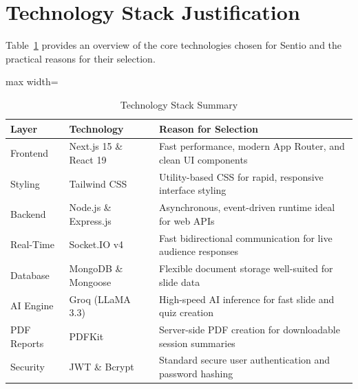 \section{Technology Stack Justification}

Table~\ref{tab:techstack} provides an overview of the core technologies chosen for Sentio and the practical reasons for their selection.

\begin{table}[H]
\centering
\caption{Technology Stack Summary}
\label{tab:techstack}
\begin{adjustbox}{max width=\textwidth}
\begin{tabular}{lll}
\toprule
\textbf{Layer} & \textbf{Technology} & \textbf{Reason for Selection} \\
\midrule
Frontend & Next.js 15 \& React 19 & Fast performance, modern App Router, and clean UI components \\
Styling & Tailwind CSS & Utility-based CSS for rapid, responsive interface styling \\
Backend & Node.js \& Express.js & Asynchronous, event-driven runtime ideal for web APIs \\
Real-Time & Socket.IO v4 & Fast bidirectional communication for live audience responses \\
Database & MongoDB \& Mongoose & Flexible document storage well-suited for slide data \\
AI Engine & Groq (LLaMA 3.3) & High-speed AI inference for fast slide and quiz creation \\
PDF Reports & PDFKit & Server-side PDF creation for downloadable session summaries \\
Security & JWT \& Bcrypt & Standard secure user authentication and password hashing \\
\bottomrule
\end{tabular}
\end{adjustbox}
\end{table}
